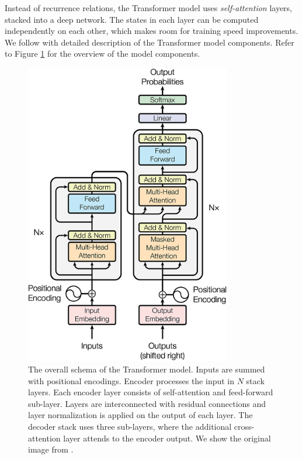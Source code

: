 Instead of recurrence relations, the Transformer model uses
\emph{self-attention} layers, stacked into a deep network. The states in each
layer can be computed independently on each other, which makes room for
training speed improvements. We follow with detailed description of the
Transformer model components. Refer to Figure \ref{fig:transformer} for
the overview of the model components.

\begin{figure}
  \centering
  \includegraphics[width=9cm]{img/transformer.png}

  \caption{The overall schema of the Transformer model. Inputs are summed with
    positional encodings. Encoder processes the input in $N$ stack layers. Each
    encoder layer consists of self-attention and feed-forward sub-layer. Layers
    are interconnected with residual connections and layer normalization is
    applied on the output of each layer. The decoder stack uses three
    sub-layers, where the additional cross-attention layer attends to the
    encoder output. We show the original image from
    \citet{vaswani2017attention}.}
  \label{fig:transformer}
\end{figure}

